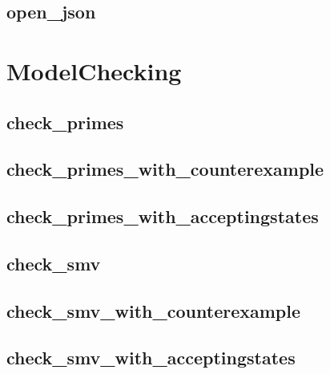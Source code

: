 \documentclass[letterpaper,10pt,english]{sphinxmanual}
\begin{document}
\subsection{open\_json}
\label{\detokenize{Phenotypes:phenotypes-open-json}}\label{\detokenize{Phenotypes:open-json}}

\section{ModelChecking}
\label{\detokenize{ModelChecking::doc}}\label{\detokenize{ModelChecking:modelchecking}}\label{\detokenize{ModelChecking:id1}}

\subsection{check\_primes}
\label{\detokenize{ModelChecking:id2}}\label{\detokenize{ModelChecking:check-primes}}

\subsection{check\_primes\_with\_counterexample}
\label{\detokenize{ModelChecking:check-primes-with-counterexample}}\label{\detokenize{ModelChecking:id3}}

\subsection{check\_primes\_with\_acceptingstates}
\label{\detokenize{ModelChecking:id4}}\label{\detokenize{ModelChecking:check-primes-with-acceptingstates}}

\subsection{check\_smv}
\label{\detokenize{ModelChecking:id5}}\label{\detokenize{ModelChecking:check-smv}}

\subsection{check\_smv\_with\_counterexample}
\label{\detokenize{ModelChecking:id6}}\label{\detokenize{ModelChecking:check-smv-with-counterexample}}

\subsection{check\_smv\_with\_acceptingstates}
\label{\detokenize{ModelChecking:id7}}\label{\detokenize{ModelChecking:check-smv-with-acceptingstates}}
\end{document}
